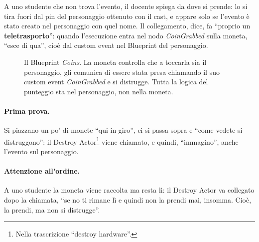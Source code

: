 A uno studente che non trova l'evento, il docente spiega da dove si prende:
lo si tira fuori dal pin del personaggio ottenuto con il cast, e appare solo
se l'evento è stato creato nel personaggio con quel nome. Il collegamento,
dice, fa ``proprio un \textbf{teletrasporto}'': quando l'esecuzione entra nel
nodo \emph{CoinGrabbed} sulla moneta, ``esce di qua'', cioè dal custom event
nel Blueprint del personaggio.

\begin{figure}[htbp]
\centering
{}
\caption{Il Blueprint \emph{Coins}. La moneta controlla che a toccarla sia il
personaggio, gli comunica di essere stata presa chiamando il suo custom event
\emph{CoinGrabbed} e si distrugge. Tutta la logica del punteggio sta nel
personaggio, non nella moneta.}
\label{gd16:fig:coin}
\end{figure}

\paragraph{Prima prova.} Si piazzano un po' di monete ``qui in giro'', ci si
passa sopra e ``come vedete si distruggono'': il Destroy
Actor\footnote{Nella trascrizione ``destroy hardware''.} viene chiamato, e
quindi, ``immagino'', anche l'evento sul personaggio.

\paragraph{Attenzione all'ordine.} A uno studente la moneta viene raccolta ma
resta lì: il Destroy Actor va collegato dopo la chiamata, ``se no ti rimane lì
e quindi non la prendi mai, insomma. Cioè, la prendi, ma non si distrugge''.

